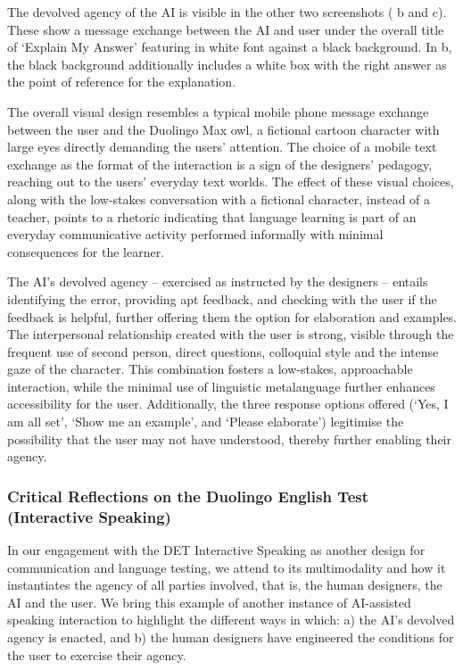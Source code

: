 \documentclass[english]{textolivre}
\begin{document}
\begin{enumerate}[label=\alph*.]
The devolved agency of the AI is visible in the other two screenshots ( b and c). These show a message exchange between the AI and user under the overall title of ‘Explain My Answer’ featuring in white font against a black background. In  b, the black background additionally includes a white box with the right answer as the point of reference for the explanation.

The overall visual design resembles a typical mobile phone message exchange between the user and the Duolingo Max owl, a fictional cartoon character with large eyes directly demanding the users’ attention. The choice of a mobile text exchange as the format of the interaction is a sign of the designers’ pedagogy, reaching out to the users’ everyday text worlds. The effect of these visual choices, along with the low-stakes conversation with a fictional character, instead of a teacher, points to a rhetoric indicating that language learning is part of an everyday communicative activity performed informally with minimal consequences for the learner.

The AI’s devolved agency – exercised as instructed by the designers – entails identifying the error, providing apt feedback, and checking with the user if the feedback is helpful, further offering them the option for elaboration and examples. The interpersonal relationship created with the user is strong, visible through the frequent use of second person, direct questions, colloquial style and the intense gaze of the character. This combination fosters a low‑stakes, approachable interaction, while the minimal use of linguistic metalanguage further enhances accessibility for the user. Additionally, the three response options offered (‘Yes, I am all set’, ‘Show me an example’, and ‘Please elaborate’) legitimise the possibility that the user may not have understood, thereby further enabling their agency.
\end{enumerate}

\subsubsection{Critical Reflections on the Duolingo English Test (Interactive Speaking)}\label{sec-organizacao}
In our engagement with the DET Interactive Speaking as another design for communication and language testing, we attend to its multimodality and how it instantiates the agency of all parties involved, that is, the human designers, the AI and the user. We bring this example of another instance of AI-assisted speaking interaction to highlight the different ways in which: a) the AI’s devolved agency is enacted, and b) the human designers have engineered the conditions for the user to exercise their agency.
\end{document}
